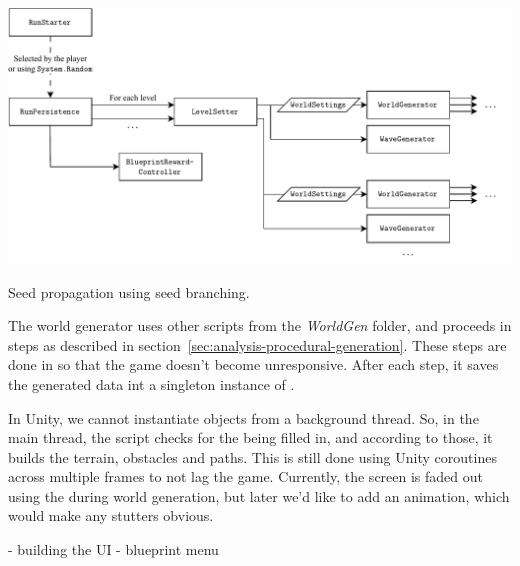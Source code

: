 \begin{center}
    \captionsetup{type=figure}
    \includegraphics[width=\textwidth]{img/seed splitting.pdf}
    \caption{Seed propagation using seed branching.}
    \label{fig:seed-branching}
\end{center}

The world generator uses other scripts from the \emph{WorldGen} folder, and proceeds in steps as described in section~\ref{sec:analysis-procedural-generation}.
These steps are done in so that the game doesn't become unresponsive.
After each step, it saves the generated data int a singleton instance of .

In Unity, we cannot instantiate objects from a background thread.
So, in the main thread, the script  checks for the  being filled in, and according to those, it builds the terrain, obstacles and paths.
This is still done using Unity coroutines across multiple frames to not lag the game.
Currently, the screen is faded out using the  during world generation, but later we'd like to add an animation, which would make any stutters obvious.

- building the UI - blueprint menu